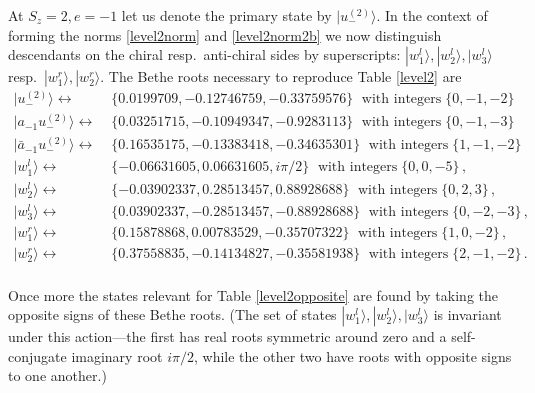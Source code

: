 \documentclass[a4paper,10pt]{article}
\newcommand{\linnea}[1]{$\framebox{\tiny L}$\ \textbf{\texttt{{\color{red}\footnotesize#1}}}}
\newcommand{\jesper}[1]{$\framebox{\tiny J}$\ \textbf{\texttt{{\color{cyan}\footnotesize#1}}}}
\begin{document}
At $S_z=2, e=-1$  let us denote the primary state by $|u_{-}^{(2)}\rangle$. In the context of forming the norms \eqref{level2norm} and \eqref{level2norm2b} we now distinguish descendants on the chiral resp.\ anti-chiral sides by superscripts: $| w_1^{l} \rangle, | w_2^{l} \rangle, | w_3^{l} \rangle$ resp.\ $| w_1^{r} \rangle, | w_2^{r} \rangle$. The Bethe roots necessary to reproduce Table \ref{level2} are
\begin{equation}
\begin{split}
| u_-^{(2)} \rangle \leftrightarrow&\; \{ 0.0199709 , -0.12746759 , -0.33759576 \} \;\text{ with integers}\; \{0,-1,-2\} \\
%
|a_{-1} u_-^{(2)} \rangle \leftrightarrow&\; \{ 0.03251715 , -0.10949347 , -0.9283113 \} \;\text{ with integers}\;  \{0,-1,-3\}\\
|\bar{a}_{-1} u_-^{(2)} \rangle \leftrightarrow&\; \{ 0.16535175 , -0.13383418 , -0.34635301 \} \;\text{ with integers}\; \{1,-1,-2\} \\
%
|  w_1^{l} \rangle \leftrightarrow&\; \{ -0.06631605 , 0.06631605 , i\pi/2 \} \;\text{ with integers}\; \{0,0,-5\} \,, \\
|  w_2^{l} \rangle \leftrightarrow&\; \{ -0.03902337 , 0.28513457 , 0.88928688 \}
 \;\text{ with integers}\; \{0,2,3\} \,, \\
|  w_3^{l} \rangle \leftrightarrow&\; \{ 0.03902337 , -0.28513457 , -0.88928688 \} \;\text{ with integers}\; \{0,-2,-3\} \,, \\
|  w_1^{r} \rangle \leftrightarrow&\; \{ 0.15878868 , 0.00783529 , -0.35707322 \} \;\text{ with integers}\; \{1,0,-2\} \,, \\
|  w_2^{r} \rangle \leftrightarrow&\; \{ 0.37558835 , -0.14134827 , -0.35581938 \} \;\text{ with integers}\;  \{2,-1,-2\} \,.\\
\end{split}
\end{equation}


Once more the states relevant for Table \ref{level2opposite} are found by taking the opposite signs of these Bethe roots. (The set of states $| w_1^{l} \rangle,|  w_2^{l} \rangle ,|  w_3^{l} \rangle $ is invariant under this action---the first has real roots symmetric around zero and a self-conjugate imaginary root $i\pi/2$, while the other two have roots with opposite signs to one another.)

\end{document}
